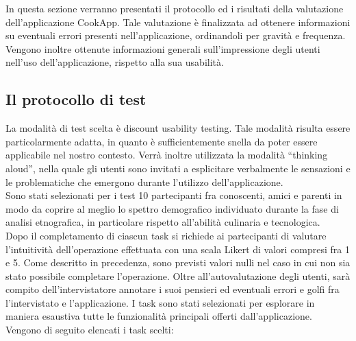 In questa sezione verranno presentati il protocollo ed i risultati della valutazione
dell'applicazione CookApp. Tale valutazione è finalizzata ad ottenere informazioni su
eventuali errori presenti nell'applicazione, ordinandoli per gravità e frequenza. Vengono
inoltre ottenute informazioni generali sull'impressione degli utenti nell'uso dell'applicazione,
rispetto alla sua usabilità.

\subsection{Il protocollo di test}
La modalità di test scelta è discount usability testing. Tale modalità risulta essere particolarmente
adatta, in quanto è sufficientemente snella da poter essere applicabile nel nostro contesto.
Verrà inoltre utilizzata la modalità ``thinking aloud'', nella quale gli utenti sono invitati a esplicitare
verbalmente le sensazioni e le problematiche che emergono durante l'utilizzo dell'applicazione.\\
Sono stati selezionati per i test 10 partecipanti fra conoscenti, amici e parenti in modo da coprire al meglio lo spettro
demografico individuato durante la fase di analisi etnografica, in particolare rispetto all'abilità culinaria e tecnologica.\\
Dopo il completamento di ciascun task si richiede ai partecipanti di valutare
l'intuitività dell'operazione effettuata con una scala
Likert di valori compresi fra 1 e 5. Come descritto in precedenza, sono previsti valori nulli nel caso in cui non sia stato
possibile completare l'operazione. Oltre all'autovalutazione degli utenti, sarà compito dell'intervistatore annotare i suoi pensieri
ed eventuali errori e golfi fra l'intervistato e l'applicazione.
I task sono stati selezionati per esplorare in maniera esaustiva tutte le funzionalità principali offerti dall'applicazione.
Vengono di seguito elencati i task scelti:
